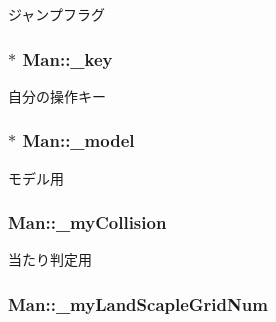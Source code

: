 ジャンプフラグ 

\hypertarget{class_man_ac2efd76a0685583f4faad618b4961542}{
\subsubsection[{\-\_\-key}]{$\ast$ Man\-::\-\_\-key\hspace{0.3cm}{\ttfamily [protected]}}}\label{class_man_ac2efd76a0685583f4faad618b4961542}


自分の操作キー 

\hypertarget{class_man_a0e9a8437e880e5bc17ca83a89b0a716d}{
\subsubsection[{\-\_\-model}]{$\ast$ Man\-::\-\_\-model\hspace{0.3cm}{\ttfamily [protected]}}}\label{class_man_a0e9a8437e880e5bc17ca83a89b0a716d}


モデル用 

\hypertarget{class_man_af9bbaacbb75df8c52d44133df86b3778}{
\subsubsection[{\-\_\-my\-Collision}]{ Man\-::\-\_\-my\-Collision\hspace{0.3cm}{\ttfamily [protected]}}}\label{class_man_af9bbaacbb75df8c52d44133df86b3778}


当たり判定用 

\hypertarget{class_man_ab8554a2b8918e3da6067fbf5ec4d2585}{
\subsubsection[{\-\_\-my\-Land\-Scaple\-Grid\-Num}]{ Man\-::\-\_\-my\-Land\-Scaple\-Grid\-Num\hspace{0.3cm}{\ttfamily [protected]}}}\label{class_man_ab8554a2b8918e3da6067fbf5ec4d2585}


